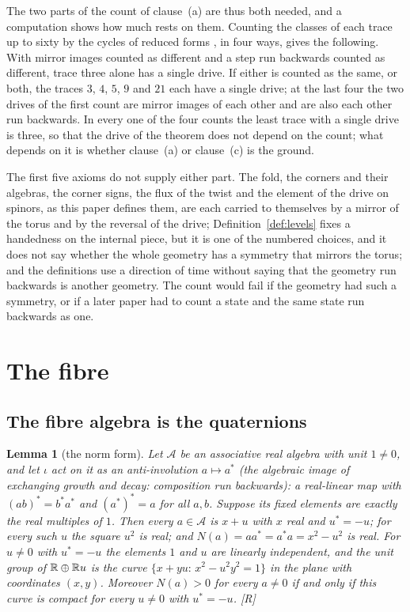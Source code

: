 \documentclass[11pt,a4paper]{article}
\theoremstyle{plain}
\newtheorem{lemma}[theorem]{Lemma}
\theoremstyle{definition}
\theoremstyle{remark}
\newcommand{\rigR}{[\textup{R}]}
\begin{document}
The two parts of the count of clause~(a) are thus both needed, and a computation shows how much rests on them. Counting the classes of each trace up to sixty by the cycles of reduced forms \cite{Gauss1801}, in four ways, gives the following. With mirror images counted as different and a step run backwards counted as different, trace three alone has a single drive. If either is counted as the same, or both, the traces $3$, $4$, $5$, $9$ and $21$ each have a single drive; at the last four the two drives of the first count are mirror images of each other and are also each other run backwards. In every one of the four counts the least trace with a single drive is three, so that the drive of the theorem does not depend on the count; what depends on it is whether clause~(a) or clause~(c) is the ground.

The first five axioms do not supply either part. The fold, the corners and their algebras, the corner signs, the flux of the twist and the element of the drive on spinors, as this paper defines them, are each carried to themselves by a mirror of the torus and by the reversal of the drive; Definition~\ref{def:levels} fixes a handedness on the internal piece, but it is one of the numbered choices, and it does not say whether the whole geometry has a symmetry that mirrors the torus; and the definitions use a direction of time without saying that the geometry run backwards is another geometry. The count would fail if the geometry had such a symmetry, or if a later paper had to count a state and the same state run backwards as one.

\section{The fibre}\label{sec:fibre}

\subsection{The fibre algebra is the quaternions}

\begin{lemma}[the norm form]\label{lem:norm}
Let $\mathcal{A}$ be an associative real algebra with unit $1\neq0$, and let $\iota$ act on it as an anti-involution $a\mapsto a^{*}$ (the algebraic image of exchanging growth and decay: composition run backwards): a real-linear map with $(ab)^{*}=b^{*}a^{*}$ and $(a^{*})^{*}=a$ for all $a,b$. Suppose its fixed elements are exactly the real multiples of $1$. Then every $a\in\mathcal{A}$ is $x+u$ with $x$ real and $u^{*}=-u$; for every such $u$ the square $u^{2}$ is real; and $N(a)=aa^{*}=a^{*}a=x^{2}-u^{2}$ is real. For $u\neq0$ with $u^{*}=-u$ the elements $1$ and $u$ are linearly independent, and the unit group of $\mathbb{R}\oplus\mathbb{R} u$ is the curve $\{x+yu:\,x^{2}-u^{2}y^{2}=1\}$ in the plane with coordinates $(x,y)$. Moreover $N(a)>0$ for every $a\neq0$ if and only if this curve is compact for every $u\neq0$ with $u^{*}=-u$. \rigR
\end{lemma}
\end{document}
